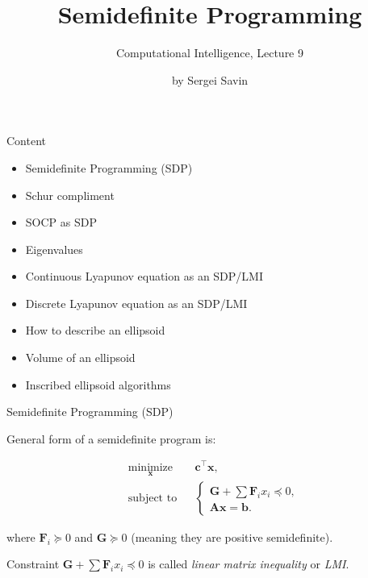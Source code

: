 \documentclass{beamer}
\title{Semidefinite Programming}
\subtitle{Computational Intelligence, Lecture 9}
\author{by Sergei Savin}
\date{\mydate}
\begin{document}
\maketitle


\begin{frame}{Content}

\begin{itemize}
\item  Semidefinite Programming (SDP)
\item  Schur compliment
\item  SOCP as SDP
\item  Eigenvalues
\item  Continuous Lyapunov equation as an SDP/LMI
\item  Discrete Lyapunov equation as an SDP/LMI
\item How to describe an ellipsoid
\item Volume of an ellipsoid
\item Inscribed ellipsoid algorithms
\end{itemize}
\end{frame}



\begin{frame}{Semidefinite Programming (SDP)}
\begin{flushleft}

General form of a semidefinite program is:

%
\begin{equation}
\begin{aligned}
& \underset{\mathbf{x}}{\text{minimize}}
& & \mathbf{c}^\top\mathbf{x}, \\
& \text{subject to}
& & \begin{cases}
    \mathbf{G} + \sum \mathbf{F}_i x_i \preceq 0, \\
    \mathbf{A}\mathbf{x} = \mathbf{b}.
    \end{cases}
\end{aligned}
\end{equation}

where $\mathbf{F}_i \succeq 0$ and $\mathbf{G} \succeq 0$ (meaning they are positive semidefinite).

\bigskip

Constraint $\mathbf{G} + \sum \mathbf{F}_i x_i \preceq 0$ is called \emph{linear matrix inequality} or \emph{LMI}.
 
\end{flushleft}
\end{frame}
\end{document}
